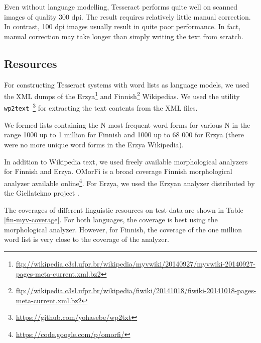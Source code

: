 \documentclass[b5paper]{article}
\begin{document}
Even without language modelling, Tesseract performs quite well on
scanned images of quality 300 dpi. The result requires relatively
little manual correction. In contrast, 100 dpi images usually result
in quite poor performance. In fact, manual correction may take
longer than simply writing the text from scratch.

\subsection{Resources}
For constructing Tesseract systems with word lists as language models,
we used the XML dumps of the
Erzya\footnote{\url{ftp://wikipedia.c3sl.ufpr.br/wikipedia/myvwiki/20140927/myvwiki-20140927-pages-meta-current.xml.bz2}}
and
Finnish\footnote{\url{ftp://wikipedia.c3sl.ufpr.br/wikipedia/fiwiki/20141018/fiwiki-20141018-pages-meta-current.xml.bz2}}
Wikipedias. We used the utility {\tt
  wp2text}~\footnote{\url{https://github.com/yohasebe/wp2txt}} for
extracting the text contents from the XML files.

We formed lists containing the N most frequent word forms for various
N in the range 1000 up to 1 million for Finnish and 1000 up to 68 000
for Erzya (there were no more unique word forms in the Erzya
Wikipedia).
 
In addition to Wikipedia text, we used freely available morphological
analyzers for Finnish and Erzya. OMorFi \cite{pirinen11} is a broad
coverage Finnish morphological analyzer available
online\footnote{\url{https://code.google.com/p/omorfi/}}. For Erzya,
we used the Erzyan analyzer distributed by the Giellatekno project
\cite{moshagen14}.

The coverages of different linguistic resources on test data are shown
in Table \ref{fin-myv-coverage}. For both languages, the coverage is
best using the morphological analyzer. However, for Finnish, the
coverage of the one million word list is very close to the coverage of
the analyzer.
\end{document}
